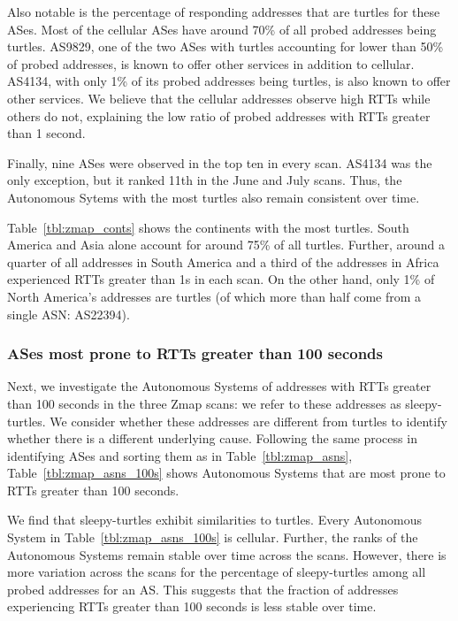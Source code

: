 Also notable is the percentage of responding addresses
that are turtles for these ASes. Most of the cellular ASes have around
70\% of all probed addresses being turtles. 
AS9829, one of the two ASes with turtles accounting
for lower than 50\% of probed addresses, is known to offer other
services in addition to cellular. 
%
AS4134, with only 1\% of its probed addresses
being turtles, is also known to offer other services.
We believe that the cellular addresses observe high RTTs while
others do not, explaining the low ratio of probed addresses with
RTTs greater than 1 second.
%

%
Finally, nine ASes were observed in the top
ten in every scan. AS4134 was the only exception, but it ranked 11th in the June and
July scans. Thus, the Autonomous Sytems with the most
turtles also remain consistent over time.
%


Table~\ref{tbl:zmap_conts}  shows the continents with the most turtles. South America and Asia alone
account for around 75\% of all turtles.
%
Further, around a quarter of all
addresses in South America and a third of the addresses in Africa experienced
RTTs greater than 1s in each scan.
%
On the other hand, only 1\% of North America's addresses are turtles
(of which more than
half come from a single ASN: AS22394).


\subsubsection*{ASes most prone to RTTs greater than 100 seconds}

%
Next, we investigate the Autonomous Systems of addresses with RTTs
greater than 100 seconds in the three Zmap scans: we refer to these addresses
as sleepy-turtles. 
We consider whether these addresses are different from turtles to
identify whether there is a different underlying cause.
%
Following the same process in identifying ASes and sorting them as in
Table~\ref{tbl:zmap_asns}, Table~\ref{tbl:zmap_asns_100s} shows Autonomous Systems that are
most prone to RTTs greater than 100 seconds.  
%

We find that sleepy-turtles exhibit similarities to turtles. Every Autonomous System in
Table~\ref{tbl:zmap_asns_100s} is cellular. Further, the ranks of the
Autonomous Systems remain stable over time across the scans. However,
there is more variation across the scans for the percentage of
sleepy-turtles among all probed addresses for
an AS. This suggests that the fraction of addresses experiencing RTTs
greater than 100 seconds is less stable
over time.
